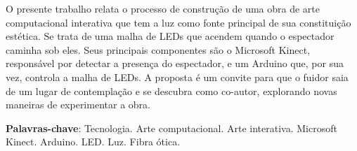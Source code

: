 \begin{RESUMO}
\thispagestyle{empty}
	\begin{SingleSpace}
	
		\hspace{-1.3 cm}O presente trabalho relata o processo de construção de uma obra de arte computacional interativa que tem a luz como fonte principal de sua constituição estética. Se trata de uma malha de LEDs que acendem quando o espectador caminha sob eles. Seus principais componentes são o Microsoft Kinect, responsável por detectar a presença do espectador, e um Arduino que, por sua vez, controla a malha de LEDs.  A proposta é um convite para que o fuidor saia de um lugar de contemplação e se descubra como co-autor, explorando novas maneiras de experimentar a obra. 
		 
		
		\vspace*{0.5cm}\hspace{-1.3 cm}\textbf{Palavras-chave}: Tecnologia. Arte computacional. Arte interativa. Microsoft Kinect. Arduino. LED. Luz. Fibra ótica.
		
	\end{SingleSpace}
\end{RESUMO}


